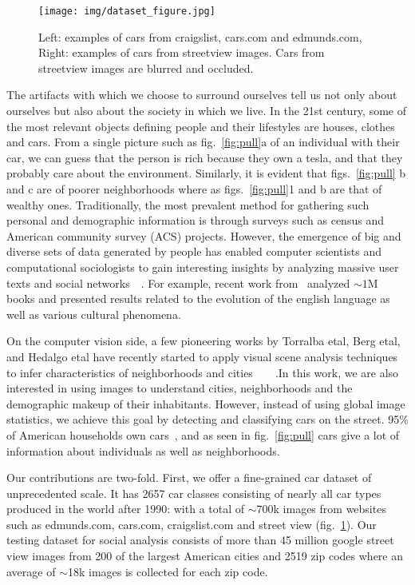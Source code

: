\documentclass[10pt,twocolumn,letterpaper]{article}
\begin{document}
\begin{figure}[t]
\begin{center}
   \texttt{[image: img/dataset\_figure.jpg]}
\end{center}
   \caption{Left: examples of cars from craigslist, cars.com and edmunds.com, Right: examples of cars from streetview images. Cars from streetview images are blurred and occluded.}
\label{fig:dataset1}
\end{figure}
The artifacts with which we choose to surround ourselves tell us not only about ourselves but also about the society in which we live. In the 21st century, some of the most relevant objects defining people and their lifestyles are houses, clothes and cars. From a single picture such as fig.~\ref{fig:pull}a of an individual with their car, we can guess that the person is rich because they own a tesla, and that they probably care about the environment. Similarly, it is evident that figs.~\ref{fig:pull} b and c are of poorer neighborhoods where as figs.~\ref{fig:pull}1 and b are that of wealthy ones. Traditionally, the most prevalent method for gathering such personal and demographic information is through surveys such as census and American community survey (ACS) projects. However, the emergence of big and diverse sets of data generated by people has enabled computer scientists and computational sociologists to gain interesting insights by analyzing massive user texts and social networks~\cite{jure}~\cite{nlp_people}. For example, recent work from~\cite{ngrams} analyzed \(\sim 1\)M books and presented results related to the evolution of the english language as well as various cultural phenomena.

On the computer vision side, a few pioneering works by Torralba etal, Berg etal, and Hedalgo etal have recently started to apply visual scene analysis techniques to infer characteristics of neighborhoods and cities~\cite{antonio}~\cite{mcdonalds}~\cite{mit_cvpr}~\cite{tamara}.In this work, we are also interested in using images to understand cities, neighborhoods and the demographic makeup of their inhabitants. However, instead of using global image statistics, we achieve this goal by detecting and classifying cars on the street. 95\% of American households own cars~\cite{car_stats}, and as seen in fig.~\ref{fig:pull} cars give a lot of information about individuals as well as neighborhoods.

Our contributions are two-fold. First, we offer a fine-grained car dataset of unprecedented scale. It has 2657 car classes consisting of nearly all car types produced in the world after 1990: with a total of \(\sim 700\)k images from websites such as edmunds.com, cars.com, craigslist.com and street view (fig.~\ref{fig:dataset1}). Our testing dataset for social analysis consists of more than 45 million google street view images from 200 of the largest American cities and 2519 zip codes where an average of \(\sim\)18k images is collected for each zip code.
\end{document}
